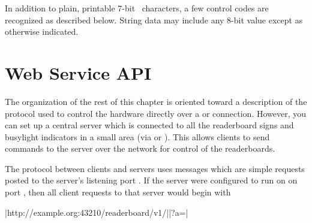 In addition to plain, printable 7-bit \ascii\ characters, a few control codes are
recognized as described below. String data may include any 8-bit value except as otherwise
indicated.

%
%
%
\section{Web Service API}
The organization of the rest of this chapter is oriented toward a description of the
protocol used to control the hardware directly over a  or 
connection. However, you can set up a central server which is connected to all the
readerboard signs and busylight indicators in a small area (via  or ).
This allows clients to send commands to the server over the network for control of the readerboards.

The protocol between clients and servers uses messages which are simple  requests
posted to the server's listening port . If the server were configured to run
on  on port , then all client requests to that server would begin with

\begin{Coding}
	|http://example.org:43210/readerboard/v1/||?a=|
\end{Coding}

